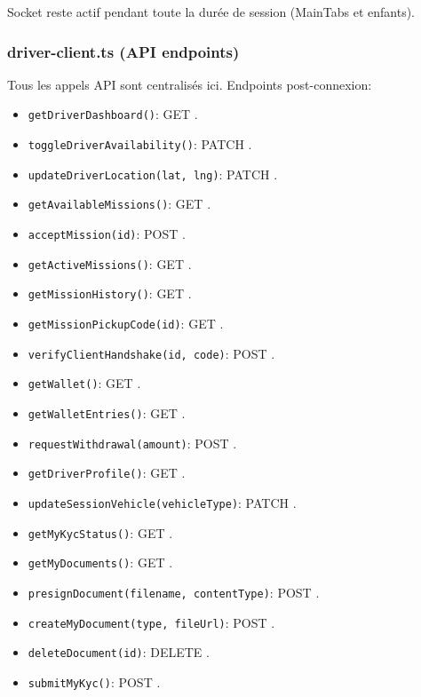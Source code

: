 Socket reste actif pendant toute la durée de session (MainTabs et enfants).

\subsubsection{driver-client.ts (API endpoints)}

Tous les appels API sont centralisés ici. Endpoints post-connexion:

\begin{itemize}
    \item \texttt{getDriverDashboard()}: GET .
    \item \texttt{toggleDriverAvailability()}: PATCH .
    \item \texttt{updateDriverLocation(lat, lng)}: PATCH .
    \item \texttt{getAvailableMissions()}: GET .
    \item \texttt{acceptMission(id)}: POST .
    \item \texttt{getActiveMissions()}: GET .
    \item \texttt{getMissionHistory()}: GET .
    \item \texttt{getMissionPickupCode(id)}: GET .
    \item \texttt{verifyClientHandshake(id, code)}: POST .
    \item \texttt{getWallet()}: GET .
    \item \texttt{getWalletEntries()}: GET .
    \item \texttt{requestWithdrawal(amount)}: POST .
    \item \texttt{getDriverProfile()}: GET .
    \item \texttt{updateSessionVehicle(vehicleType)}: PATCH .
    \item \texttt{getMyKycStatus()}: GET .
    \item \texttt{getMyDocuments()}: GET .
    \item \texttt{presignDocument(filename, contentType)}: POST .
    \item \texttt{createMyDocument(type, fileUrl)}: POST .
    \item \texttt{deleteDocument(id)}: DELETE .
    \item \texttt{submitMyKyc()}: POST .
\end{itemize}

